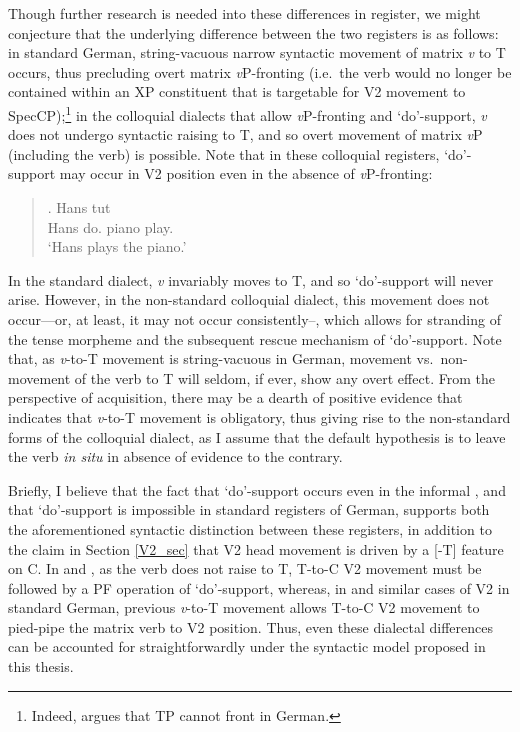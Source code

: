 Though further research is needed into these differences in register, we might conjecture that the underlying difference between the two registers is as follows: in standard German, string-vacuous narrow syntactic movement of matrix {\it v} to T occurs, thus precluding overt matrix {\it v}P-fronting (i.e.\ the verb would no longer be contained within an XP constituent that is targetable for V2 movement to SpecCP);\footnote{Indeed, \citet{wurmbrand2004} argues that TP cannot front in German.} in the colloquial dialects that allow {\it v}P-fronting and `do'-support, {\it v} does not undergo syntactic raising to T, and so overt movement of matrix {\it v}P (including the verb) is possible. Note that in these colloquial registers, `do'-support may occur in V2 position even in the absence of {\it v}P-fronting:

\singlespacing
\begin{quote}
\exg. Hans tut \\
Hans do. \hspace{1pt} piano play.\\
`Hans plays the piano.'

\end{quote}
\onehalfspacing
In the standard dialect, {\it v} invariably moves to T, and so `do'-support will never arise. However, in the non-standard colloquial dialect, this movement does not occur---or, at least, it may not occur consistently--, which allows for stranding of the tense morpheme and the subsequent rescue mechanism of `do'-support. Note that, as {\it v}-to-T movement is string-vacuous in German, movement vs.\ non-movement of the verb to T will seldom, if ever, show any overt effect. From the perspective of acquisition, there may be a dearth of positive evidence that indicates that {\it v}-to-T movement is obligatory, thus giving rise to the non-standard forms of the colloquial dialect, as I assume that the default hypothesis is to leave the verb {\it in situ} in absence of evidence to the contrary.

Briefly, I believe that the fact that `do'-support occurs even in the informal \Last, and that `do'-support is impossible in standard registers of German, supports both the aforementioned syntactic distinction between these registers, in addition to the claim in Section \ref{V2_sec} that V2 head movement is driven by a [-T] feature on C. In \LLast[b] and \Last, as the verb does not raise to T, T-to-C V2 movement must be followed by a PF operation of `do'-support, whereas, in \LLast[a] and similar cases of V2 in standard German, previous {\it v}-to-T movement allows T-to-C V2 movement to pied-pipe the matrix verb to V2 position. Thus, even these dialectal differences can be accounted for straightforwardly under the syntactic model proposed in this thesis.

